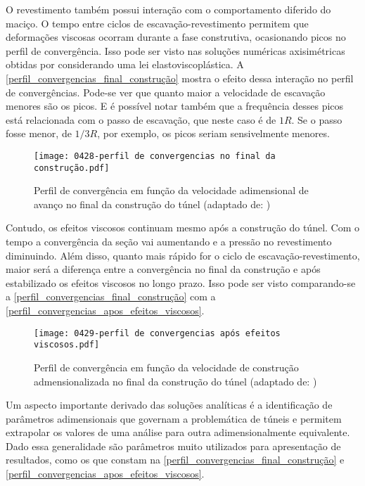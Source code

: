 O revestimento também possui interação com o comportamento diferido do maciço. O tempo entre ciclos de escavação-revestimento permitem que deformações viscosas ocorram durante a fase construtiva, ocasionando picos no perfil de convergência. Isso pode ser visto nas soluções numéricas axisimétricas obtidas por  considerando uma lei elastoviscoplástica. A \autoref{perfil_convergencias_final_construção} mostra o efeito dessa interação no perfil de convergências. Pode-se ver que quanto maior a velocidade de escavação menores são os picos. E é possível notar também que a frequência desses picos está relacionada com o passo de escavação, que neste caso é de $1R$. Se o passo fosse menor, de $1/3R$, por exemplo, os picos seriam sensivelmente menores.

\begin{figure}[H]
	\begin{center}
		\texttt{[image: 0428-perfil de convergencias no final da construção.pdf]}
	\end{center}
	\caption{\label{perfil_convergencias_final_construção}Perfil de convergência em função da velocidade adimensional de avanço no final da construção do túnel (adaptado de: )}
\end{figure}

Contudo, os efeitos viscosos continuam mesmo após a construção do túnel. Com o tempo a convergência da seção vai aumentando e a pressão no revestimento diminuindo. Além disso, quanto mais rápido for o ciclo de escavação-revestimento, maior será a diferença entre a convergência no final da construção e após estabilizado os efeitos viscosos no longo prazo. Isso pode ser visto comparando-se a \autoref{perfil_convergencias_final_construção} com a \autoref{perfil_convergencias_apos_efeitos_viscosos}.

\begin{figure}[H]
	\begin{center}
		\texttt{[image: 0429-perfil de convergencias após efeitos viscosos.pdf]}
	\end{center}
	\caption{\label{perfil_convergencias_apos_efeitos_viscosos}Perfil de convergência em função da velocidade de construção admensionalizada no final da construção do túnel (adaptado de: )}
\end{figure}

Um aspecto importante derivado das soluções analíticas é a identificação de parâmetros adimensionais que governam a problemática de túneis e permitem extrapolar os valores de uma análise para outra adimensionalmente equivalente. Dado essa generalidade são parâmetros muito utilizados para apresentação de resultados, como os que constam na \autoref{perfil_convergencias_final_construção} e \autoref{perfil_convergencias_apos_efeitos_viscosos}.

